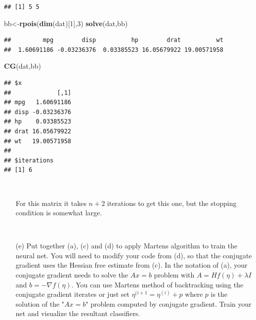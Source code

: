 \documentclass[]{article}
\newenvironment{Shaded}{\begin{snugshade}}{\end{snugshade}}
\newcommand{\KeywordTok}[1]{\textcolor[rgb]{0.13,0.29,0.53}{\textbf{#1}}}
\newcommand{\DecValTok}[1]{\textcolor[rgb]{0.00,0.00,0.81}{#1}}
\newcommand{\NormalTok}[1]{#1}
\begin{document}
\begin{verbatim}
## [1] 5 5
\end{verbatim}

\begin{Shaded}
\begin{Highlighting}[]
\NormalTok{bb<-}\KeywordTok{rpois}\NormalTok{(}\KeywordTok{dim}\NormalTok{(dat)[}\DecValTok{1}\NormalTok{],}\DecValTok{3}\NormalTok{)}
\KeywordTok{solve}\NormalTok{(dat,bb)}
\end{Highlighting}
\end{Shaded}

\begin{verbatim}
##         mpg        disp          hp        drat          wt 
##  1.60691186 -0.03236376  0.03385523 16.05679922 19.00571958
\end{verbatim}

\begin{Shaded}
\begin{Highlighting}[]
\KeywordTok{CG}\NormalTok{(dat,bb) }
\end{Highlighting}
\end{Shaded}

\begin{verbatim}
## $x
##             [,1]
## mpg   1.60691186
## disp -0.03236376
## hp    0.03385523
## drat 16.05679922
## wt   19.00571958
## 
## $iterations
## [1] 6
\end{verbatim}

~

\begin{itemize} \item[] 
 For this matrix it takes $n+2$ iterations to get this one, but the stopping condition is somewhat large.
   \end{itemize}

~

\begin{itemize}  \item[(e)] 
Put together (a), (c) and (d) to apply Martens algorithm to train the neural net.  You will need to modify your code from (d), so that the conjugate gradient uses the Hessian free estimate from (c).  In the notation of (a), your conjugate gradient needs to solve the $Ax=b$ problem with $A = Hf(\eta) + \lambda I$ and $b = -\nabla f(\eta)$.  You can use Martens method of backtracking using the conjugate gradient iterates or just set $\eta^{(i+1} = \eta^{(i)} + p$ where $p$ is the solution of the "$Ax=b$" problem computed by conjugate gradient.    Train your net and visualize the resultant classifiers.
  \end{itemize}
\end{document}
